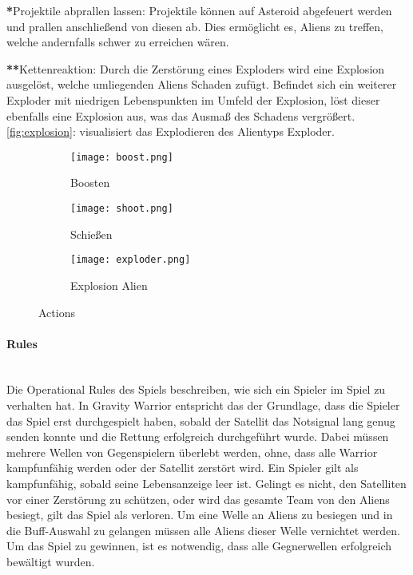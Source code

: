 \documentclass[11pt]{scrartcl}
\newcommand{\lbparagraph}[1]{\paragraph*{#1}\mbox{}\\}
\begin{document}
\textbf{*}Projektile abprallen lassen: Projektile können auf Asteroid abgefeuert werden und prallen anschließend von diesen ab. Dies ermöglicht es, Aliens zu treffen, welche andernfalls schwer zu erreichen wären.

\textbf{**}Kettenreaktion: Durch die Zerstörung eines Exploders wird eine Explosion
ausgelöst, welche umliegenden Aliens Schaden zufügt. Befindet sich ein weiterer Exploder mit niedrigen Lebenspunkten im Umfeld der Explosion, löst dieser ebenfalls eine Explosion aus, was das Ausmaß des Schadens vergrößert. \autoref{fig:explosion}:  visualisiert das Explodieren des Alientyps Exploder.  


\begin{figure}[htp]
  \begin{subfigure}[b]{0.32\textwidth}
    \texttt{[image: boost.png]}
    \caption{Boosten}
    \label{fig:boost}
  \end{subfigure}
  \begin{subfigure}[b]{0.32\textwidth}
    \texttt{[image: shoot.png]}
    \caption{Schießen}
    \label{fig:shoot}
  \end{subfigure}
  \begin{subfigure}[b]{0.32\textwidth}
    \texttt{[image: exploder.png]}
    \caption{Explosion Alien}
    \label{fig:explosion}
  \end{subfigure}
  \caption{Actions}
  \label{fig:actions}
\end{figure}


\lbparagraph{Rules}
Die Operational Rules des Spiels beschreiben, wie sich ein Spieler im Spiel zu verhalten hat\cite{K2011}. In Gravity Warrior entspricht das der Grundlage, dass die Spieler das Spiel erst durchgespielt haben, sobald der Satellit das Notsignal lang genug senden konnte und die Rettung erfolgreich durchgeführt wurde. Dabei müssen mehrere Wellen von Gegenspielern überlebt werden, ohne, dass alle Warrior kampfunfähig werden oder der Satellit zerstört wird. Ein Spieler gilt als kampfunfähig, sobald seine Lebensanzeige leer ist. Gelingt es nicht, den Satelliten vor einer Zerstörung zu schützen, oder wird das gesamte Team von den Aliens besiegt, gilt das Spiel als verloren. Um eine Welle an Aliens zu besiegen und in die Buff-Auswahl zu gelangen müssen alle Aliens dieser Welle vernichtet werden. Um das Spiel zu gewinnen, ist es notwendig, dass alle Gegnerwellen erfolgreich bewältigt wurden.
\end{document}

